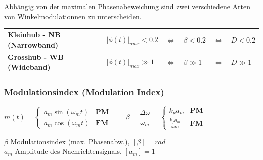 Abhängig von der maximalen Phasenabeweichung sind zwei verschiedene Arten von Winkelmodulationnen zu
unterscheiden. \\

\begin{tabular}{llll}
\textbf{Kleinhub - NB (Narrowband)} 
	& $|\phi(t)|_{max} < 0.2$ 
	& $\Leftrightarrow \quad \beta < 0.2$
	& $\Leftrightarrow \quad D < 0.2$ \\

\textbf{Grosshub - WB (Wideband)}
 & $|\phi(t)|_{max} \gg 1$
 & $\Leftrightarrow \quad \beta \gg 1$
 & $\Leftrightarrow \quad D \gg 1$ \\

\end{tabular}
 



\subsubsection{Modulationsindex (Modulation Index)}
\begin{minipage}[t][0.7cm][c]{10cm}

$ m(t) = \begin{cases}
          	a_m \sin(\omega_m t)  & \textbf{PM}\\
          	a_m \cos(\omega_m t)  & \textbf{FM}
          \end{cases}  
\qquad
\beta = \dfrac{\Delta \omega}{\omega_m} =
\begin{cases}
	k_p a_m & \textbf{PM}  \\
	\frac{k_f a_m}{\omega m} & \textbf{FM}
\end{cases} 
$
\end{minipage}
\begin{minipage}[t][0.7cm][c]{8cm}
	$\beta$ Modulationsindex (max. Phasenabw.), $[\beta] = rad$ \\
	$a_m$ Amplitude des Nachrichtensignals, $[a_m] = 1$ %
\end{minipage}

